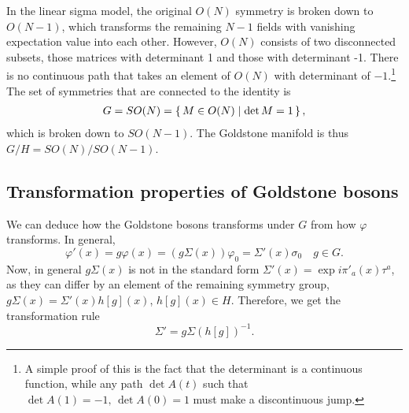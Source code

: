 In the linear sigma model, the original $O(N)$ symmetry is broken down to $O(N-1)$, which transforms the remaining $N-1$ fields with vanishing expectation value into each other.
However, $O(N)$ consists of two disconnected subsets, those matrices with determinant 1 and those with determinant -1.
There is no continuous path that takes an element of $O(N)$ with determinant of $-1$.\footnote{A simple proof of this is the fact that the determinant is a continuous function, while any path $\det A(t)$ such that $\det A(1) = -1,\, \det A(0) = 1$ must make a discontinuous jump.}
The set of symmetries that are connected to the identity is
\begin{eqnarray}
    G = SO(N) = \left\{\, M \in O(N) \mid  \det M = 1 \,\right\},
\end{eqnarray}
which is broken down to $SO(N-1)$.
The Goldstone manifold is thus $G/H = SO(N) / SO(N-1)$.

\subsection*{Transformation properties of Goldstone bosons}
We can deduce how the Goldstone bosons transforms under $G$ from how $\varphi$ transforms.
In general, 
\begin{equation}
    \varphi'(x) = g \varphi(x) = (g \Sigma(x)) \varphi_0 = \Sigma'(x) \sigma_0 \quad g \in G.
\end{equation}
Now, in general $g \Sigma(x)$ is not in the standard form $\Sigma'(x) = \exp{i \pi'_a(x)\tau^a}$, as they can differ by an element of the remaining symmetry group, $g\Sigma(x) = \Sigma'(x) h[g](x)$, $h[g](x) \in H$.
Therefore, we get the transformation rule
\begin{equation}
    \Sigma' = g \Sigma (h[g])^{-1}.
\end{equation}
